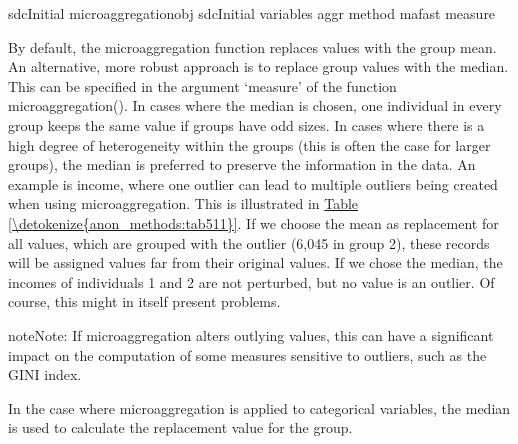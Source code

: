 \documentclass[letterpaper,10pt,english]{sphinxmanual}
\begin{document}
\def\sphinxLiteralBlockLabel{\label{\detokenize{anon_methods:code516}}}
%
\begin{sphinxVerbatim}[commandchars=\\\{\},numbers=left,firstnumber=1,stepnumber=1]
sdcInitial  microaggregationobj  sdcInitial variables  
                               aggr   method  mafast measure  
\end{sphinxVerbatim}

By default, the microaggregation function replaces values with the group
mean. An alternative, more robust approach is to replace group values
with the median. This can be specified in the argument ‘measure’ of the
function microaggregation(). In cases where the median is chosen, one
individual in every group keeps the same value if groups have odd sizes.
In cases where there is a high degree of heterogeneity within the groups
(this is often the case for larger groups), the median is preferred to
preserve the information in the data. An example is income, where one
outlier can lead to multiple outliers being created when using
microaggregation. This is illustrated in \hyperref[\detokenize{anon_methods:tab511}]{Table \ref{\detokenize{anon_methods:tab511}}}. If we choose the
mean as replacement for all values, which are grouped with the outlier
(6,045 in group 2), these records will be assigned values far from their
original values. If we chose the median, the incomes of individuals 1
and 2 are not perturbed, but no value is an outlier. Of course, this
might in itself present problems.

\begin{sphinxadmonition}{note}{Note:}
If microaggregation alters
outlying values, this can have a significant impact on the computation
of some measures sensitive to outliers, such as the GINI index.
\end{sphinxadmonition}

In the
case where microaggregation is applied to categorical variables, the
median is used to calculate the replacement value for the group.
\end{document}
